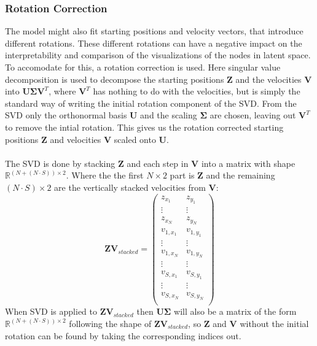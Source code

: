 \subsubsection{Rotation Correction}
\label{sec:Method:ProposedModel:RotationCorrection}
The model might also fit starting positions and velocity vectors, that introduce different rotations. These different rotations can have a negative impact on the interpretability and comparison of the visualizations of the nodes in latent space. To accomodate for this, a rotation correction is used. Here singular value decomposition is used to decompose the starting positions $\textbf{Z}$ and the velocities $\textbf{V}$ into $\textbf{U} \boldsymbol{\Sigma} \textbf{V}^{T}$, where $\textbf{V}^T$ has nothing to do with the velocities, but is simply the standard way of writing the initial rotation component of the SVD\cite{Lange2010SingularDecomposition}. 
From the SVD only the orthonormal basis $\textbf{U}$ and the scaling $\boldsymbol{\Sigma}$ are chosen, leaving out $\textbf{V}^{T}$ to remove the intial rotation. This gives us the rotation corrected starting positions $\textbf{Z}$ and velocities $\textbf{V}$ scaled onto $\textbf{U}$.
\\\\
The SVD is done by stacking $\textbf{Z}$ and each step in $\textbf{V}$ into a matrix with shape $\mathbb{R}^{(N+(N \cdot S)) \times 2}$. Where the the first $N \times 2$ part is $\textbf{Z}$ and the remaining $(N\cdot S) \times 2$ are the vertically stacked velocities from $\textbf{V}$:
\begin{equation}
    \textbf{ZV}_{stacked} = 
    \begin{pmatrix}
       z_{x_1} & z_{y_1} \\
       \vdots & \vdots  \\
       z_{x_N} & z_{y_N} \\
       v_{1, x_1} & v_{1,y_1} \\
       \vdots & \vdots  \\
       v_{1,x_N} & v_{1,y_N} \\
       \vdots & \vdots  \\
       v_{S, x_1} & v_{S,y_1} \\
       \vdots & \vdots  \\
       v_{S,x_N} & v_{S,y_N} \\
    \end{pmatrix}
\end{equation}
\noindent
When SVD is applied to $\textbf{ZV}_{stacked}$ then $\textbf{U}\boldsymbol{\Sigma}$ will also be a matrix of the form $\mathbb{R}^{(N+(N \cdot S)) \times 2}$ following the shape of $\textbf{ZV}_{stacked}$, so $\textbf{Z}$ and $\textbf{V}$ without the initial rotation can be found by taking the corresponding indices out.
